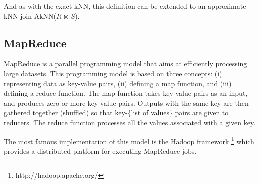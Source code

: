 And as with the exact kNN, this definition can be extended to an approximate kNN join AkNN($R$ $\ltimes$ $S$).

\subsection{MapReduce}
MapReduce \cite{Dean:2008:MSD:1327452.1327492} is a parallel programming model that aims at efficiently processing large datasets. This programming 
model is based on three concepts: (i) representing data as key-value pairs, (ii) defining a map function, and (iii) defining a reduce function. 
The map function takes key-value pairs as an input, and produces zero or more key-value pairs. Outputs with the same key are then gathered together (shuffled) so that key-\{list of values\} pairs are given to reducers. The reduce function processes all the values associated
with a given key. 

The most famous implementation
of this model is the Hadoop framework \footnote{http://hadoop.apache.org/} which provides a distributed platform for executing MapReduce jobs. 

